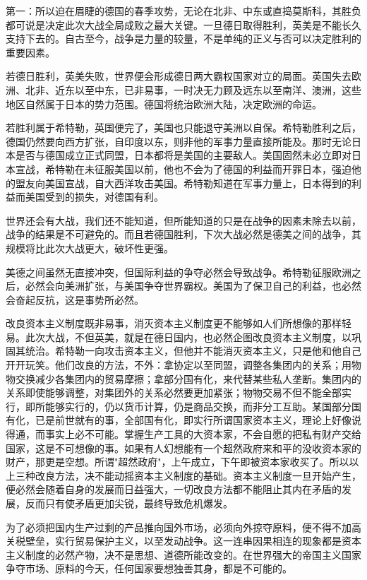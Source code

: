 \documentclass[
  openany,           %
  12pt,              %
  a4paper            %
]{ctexbook}
\begin{document}
第一：所以迫在眉睫的德国的春季攻势，无论在北非、中东或直捣莫斯科，其胜负都可说是决定此次大战全局成败之最大关键。一旦德日取得胜利，英美是不能长久支持下去的。自古至今，战争是力量的较量，不是单纯的正义与否可以决定胜利的重要因素。

若德日胜利，英美失败，世界便会形成德日两大霸权国家对立的局面。英国失去欧洲、北非、近东以至中东，已非易事，一时决无力顾及远东以至南洋、澳洲，这些地区自然属于日本的势力范围。德国将统治欧洲大陆，决定欧洲的命运。

若胜利属于希特勒，英国便完了，美国也只能退守美洲以自保。希特勒胜利之后，德国仍然要向西方扩张，自印度以东，则非他的军事力量直接所能及。那时无论日本是否与德国成立正式同盟，日本都将是美国的主要敌人。美国固然未必立即对日本宣战，希特勒在未征服美国以前，他也不会为了德国的利益而开罪日本，强迫他的盟友向美国宣战，自大西洋攻击美国。希特勒知道在军事力量上，日本得到的利益而美国受到的损失，对德国有利。

世界还会有大战，我们还不能知道，但所能知道的只是在战争的因素未除去以前，战争的结果是不可避免的。而且若德国胜利，下次大战必然是德美之间的战争，其规模将比此次大战更大，破坏性更强。

美德之间虽然无直接冲突，但国际利益的争夺必然会导致战争。希特勒征服欧洲之后，必然会向美洲扩张，与美国争夺世界霸权。美国为了保卫自己的利益，也必然会奋起反抗，这是事势所必然。

改良资本主义制度既非易事，消灭资本主义制度更不能够如人们所想像的那样轻易。此次大战，不但英美，就是在德日国内，也必然企图改良资本主义制度，以巩固其统治。希特勒一向攻击资本主义，但他并不能消灭资本主义，只是他和他自己开开玩笑。他们改良的方法，不外：拿协定以至同盟，调整各集团内的关系；用物物交换减少各集团内的贸易摩擦；拿部分国有化，来代替某些私人垄断。集团内的关系即使能够调整，对集团外的关系必然要更加紧张；物物交易不但不能全部实行，即所能够实行的，仍以货币计算，仍是商品交换，而非分工互助。某国部分国有化，已是前世就有的事，全部国有化，即实行所谓国家资本主义，理论上好像说得通，而事实上必不可能。掌握生产工具的大资本家，不会自愿的把私有财产交给国家，这是不可想像的事。如果有人幻想能有一个超然政府来和平的没收资本家的财产，那更是空想。所谓"超然政府"，上午成立，下午即被资本家收买了。所以以上三种改良方法，决不能动摇资本主义制度的基础。资本主义制度一旦开始产生，便必然会随着自身的发展而日益强大，一切改良方法都不能阻止其内在矛盾的发展，反而只有使矛盾更加尖锐，最终导致危机爆发。

为了必须把国内生产过剩的产品推向国外市场，必须向外掠夺原料，便不得不加高关税壁垒，实行贸易保护主义，以至发动战争。这一连串因果相连的现象都是资本主义制度的必然产物，决不是思想、道德所能改变的。在世界强大的帝国主义国家争夺市场、原料的今天，任何国家要想独善其身，都是不可能的。
\end{document}
